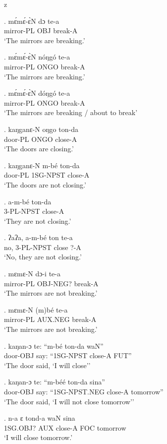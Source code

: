 z   \documentclass{assets/fieldnotes}
\begin{document}
\exg.
mɛ́mɛ́-ɛ̀N     dɔ    te-a    \\
mirror-PL   OBJ   break-A \\%
`The mirrors are breaking.'

\exg.
mɛ́mɛ́-ɛ̀N     nóŋgó   te-a    \\
mirror-PL   ONGO    break-A \\%
`The mirrors are breaking.'

\exg.
mɛ́mɛ́-ɛ̀N     dóŋgó   te-a    \\
mirror-PL   ONGO    break-A \\%
`The mirrors are breaking / about to break'

\exg.
kaŋganɛ-N   oŋgo   ton-da  \\
door-PL     ONGO   close-A \\%
`The doors are closing.'

\exg.
kaŋganɛ-N   m-bé     ton-da  \\
door-PL     1SG-NPST   close-A \\%
`The doors are not closing.'

\exg.
a-m-bé          ton-da  \\
3-PL-NPST   close-A \\%
`They are not closing.'

\exg.
ʔaʔa,   a-m-bé          ton     te-a \\
no,     3-PL-NPST   close   ?-A  \\%
`No, they are not closing.'

\exg.
mɛmɛ-N      dɔ-i       te-a    \\
mirror-PL   OBJ-NEG?   break-A \\%
`The mirrors are not breaking.'

\exg.
mɛmɛ-N      (m)bé     te-a    \\
mirror-PL   AUX.NEG   break-A \\%
`The mirrors are not breaking.'

\exg.
kaŋan-ɔ    te:    ``m-bé   ton-da    waN'' \\
door-OBJ   say:   ``1SG-NPST   close-A   FUT'' \\%
`The door said, `I will close''

\exg.
kaŋan-ɔ    te:    ``m-béé      ton-da    sina''     \\
door-OBJ   say:   ``1SG-NPST.NEG   close-A   tomorrow'' \\%
`The door said, `I will not close tomorrow''

\exg.
n-a         ɛ     tond-a    waN   sina     \\
1SG.OBJ?   AUX   close-A   FOC   tomorrow \\%
`I will close tomorrow.' \label{I will close tomorrow}
\end{document}

